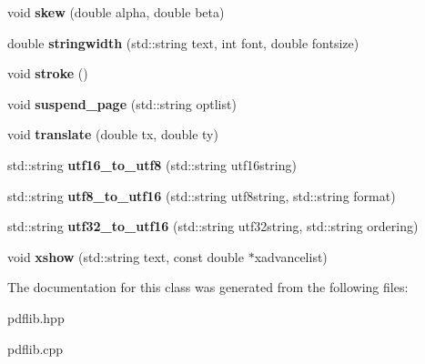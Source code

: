 \begin{DoxyCompactItemize}
\hypertarget{classPDFlib_a66323e008c1980539c58a2647af31b1a}{}\label{classPDFlib_a66323e008c1980539c58a2647af31b1a} 
void {\bfseries skew} (double alpha, double beta)
\item 
\hypertarget{classPDFlib_afd8b4b2ff6fa254cc386047bddfbede1}{}\label{classPDFlib_afd8b4b2ff6fa254cc386047bddfbede1} 
double {\bfseries stringwidth} (std\+::string text, int font, double fontsize)
\item 
\hypertarget{classPDFlib_ab212bd6e1bc82f8f00f807438218bc5d}{}\label{classPDFlib_ab212bd6e1bc82f8f00f807438218bc5d} 
void {\bfseries stroke} ()
\item 
\hypertarget{classPDFlib_ac047054d3779c38b144b3f5dbd6b81b8}{}\label{classPDFlib_ac047054d3779c38b144b3f5dbd6b81b8} 
void {\bfseries suspend\+\_\+page} (std\+::string optlist)
\item 
\hypertarget{classPDFlib_abcecfeb7a7e76092ffe5e222dbcbea25}{}\label{classPDFlib_abcecfeb7a7e76092ffe5e222dbcbea25} 
void {\bfseries translate} (double tx, double ty)
\item 
\hypertarget{classPDFlib_acd5ccd9fb08470613c9bbb976995a034}{}\label{classPDFlib_acd5ccd9fb08470613c9bbb976995a034} 
std\+::string {\bfseries utf16\+\_\+to\+\_\+utf8} (std\+::string utf16string)
\item 
\hypertarget{classPDFlib_af94465908bf96f42f2746734205ea70d}{}\label{classPDFlib_af94465908bf96f42f2746734205ea70d} 
std\+::string {\bfseries utf8\+\_\+to\+\_\+utf16} (std\+::string utf8string, std\+::string format)
\item 
\hypertarget{classPDFlib_a2fc66f507a5c98e6dfffd3dc7015b381}{}\label{classPDFlib_a2fc66f507a5c98e6dfffd3dc7015b381} 
std\+::string {\bfseries utf32\+\_\+to\+\_\+utf16} (std\+::string utf32string, std\+::string ordering)
\item 
\hypertarget{classPDFlib_aa4dc2e0ce0aed19151b9bc7ea8824e0f}{}\label{classPDFlib_aa4dc2e0ce0aed19151b9bc7ea8824e0f} 
void {\bfseries xshow} (std\+::string text, const double $\ast$xadvancelist)
\end{DoxyCompactItemize}


The documentation for this class was generated from the following files\+:\begin{DoxyCompactItemize}
\item 
pdflib.\+hpp\item 
pdflib.\+cpp\end{DoxyCompactItemize}
